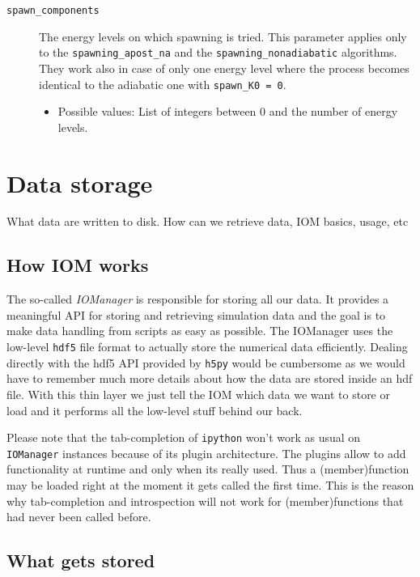 \documentclass[a4paper,10pt]{report}
\begin{document}
\begin{description}
  \item[\texttt{spawn\_components}] The energy levels on which spawning is tried.
  This parameter applies only to the \texttt{spawning\_apost\_na} and the
  \texttt{spawning\_nonadiabatic} algorithms. They work also in case
  of only one energy level where the process becomes identical to the adiabatic one
  with \texttt{spawn\_K0 = 0}.
  \begin{itemize}
    \item Possible values: List of integers between 0 and the number of energy levels.
  \end{itemize}

\end{description}


\section{Data storage}

What data are written to disk. How can we retrieve data, IOM basics, usage, etc

\subsection{How IOM works}

The so-called \emph{IOManager} is responsible for storing all our data. It provides a
meaningful API for storing and retrieving simulation data and the goal is to
make data handling from scripts as easy as possible. The IOManager uses the low-level
\texttt{hdf5} file format to actually store the numerical data efficiently. Dealing directly
with the hdf5 API provided by \texttt{h5py} would be cumbersome as we would have
to remember much more details about how the data are stored inside an hdf file. With this thin
layer we just tell the IOM which data we want to store or load and it performs
all the low-level stuff behind our back.

Please note that the tab-completion of \texttt{ipython} won't work as usual
on \texttt{IOManager} instances because of its plugin architecture. The plugins
allow to add functionality at runtime and only when its really used. Thus a
(member)function may be loaded right at the moment it gets called the first time.
This is the reason why tab-completion and introspection will not work for
(member)functions that had never been called before.

\subsection{What gets stored}
\end{document}
